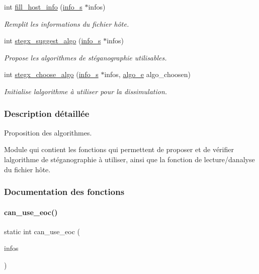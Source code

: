 \begin{DoxyCompactItemize}
int \hyperlink{a00128_a5501c9c7711252fa8d85ff12cb3390dc}{fill\+\_\+host\+\_\+info} (\hyperlink{a00008_aa8ca908d92fb5bdd3c0a9e1f58b2cf03}{info\+\_\+s} $\ast$infos)
\begin{DoxyCompactList}\small\item\em Remplit les informations du fichier hôte. \end{DoxyCompactList}\item 
int \hyperlink{a00128_adc277622e5fe0d1814be76f11263b350}{stegx\+\_\+suggest\+\_\+algo} (\hyperlink{a00008_aa8ca908d92fb5bdd3c0a9e1f58b2cf03}{info\+\_\+s} $\ast$infos)
\begin{DoxyCompactList}\small\item\em Propose les algorithmes de stéganographie utilisables. \end{DoxyCompactList}\item 
int \hyperlink{a00128_a58f7de82387e9b66f9bd7c40c32aeb8f}{stegx\+\_\+choose\+\_\+algo} (\hyperlink{a00008_aa8ca908d92fb5bdd3c0a9e1f58b2cf03}{info\+\_\+s} $\ast$infos, \hyperlink{a00008_adbe3e383e3f1c4239b26ccae2865aa06}{algo\+\_\+e} algo\+\_\+choosen)
\begin{DoxyCompactList}\small\item\em Initialise l\textquotesingle{}algorithme à utiliser pour la dissimulation. \end{DoxyCompactList}\end{DoxyCompactItemize}


\subsubsection{Description détaillée}
Proposition des algorithmes. 

Module qui contient les fonctions qui permettent de proposer et de vérifier l\textquotesingle{}algorithme de stéganographie à utiliser, ainsi que la fonction de lecture/d\textquotesingle{}analyse du fichier hôte. 

\subsubsection{Documentation des fonctions}
\mbox{\label{a00128_a39a800f242ed5484ff790ee9e92070ab}} 
\paragraph{\texorpdfstring{can\+\_\+use\+\_\+eoc()}{can\_use\_eoc()}}
{\footnotesize\ttfamily static int can\+\_\+use\+\_\+eoc (\begin{DoxyParamCaption}\item[{\hyperlink{a00008_aa8ca908d92fb5bdd3c0a9e1f58b2cf03}{info\+\_\+s} $\ast$}]{infos }\end{DoxyParamCaption})\hspace{0.3cm}{\ttfamily [static]}}



